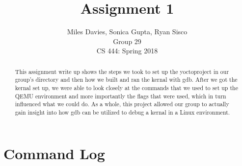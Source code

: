 \documentclass[10pt,draftclsnofoot]{article}
\title{Assignment 1}
\author{Miles Davies, Sonica Gupta, Ryan Sisco \\ Group 29 \\ CS 444: Spring 2018}
\begin{document}
\maketitle
\begin{abstract}
\noindent This assignment write up shows the steps we took to set up the yoctoproject in
our group's directory and then how we built and ran the kernal with gdb. After
we got the kernal set up, we were able to look closely at the commands that we 
used to set up the QEMU environment and more importantly the flags that were 
used, which in turn influenced what we could do. As a whole, this project allowed 
our group to actually gain insight into how gdb can be utilized to debug a kernal 
in a Linux environment.
\end{abstract}

\newpage

\tableofcontents
\newpage 

\section{Command Log}


\end{document}
